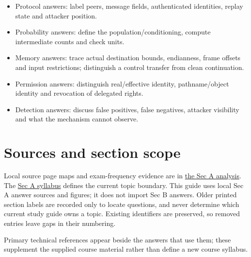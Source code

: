 \documentclass[11pt,a4paper]{article}
\begin{document}
\begin{itemize}

\item Protocol answers: label peers,\allowbreak{} message fields,\allowbreak{} authenticated identities,\allowbreak{} replay state and attacker position.

\item Probability answers: define the population/\allowbreak{}conditioning,\allowbreak{} compute intermediate counts and check units.

\item Memory answers: trace actual destination bounds,\allowbreak{} endianness,\allowbreak{} frame offsets and input restrictions; distinguish a control transfer from clean continuation.

\item Permission answers: distinguish real/\allowbreak{}effective identity,\allowbreak{} pathname/\allowbreak{}object identity and revocation of delegated rights.

\item Detection answers: discuss false positives,\allowbreak{} false negatives,\allowbreak{} attacker visibility and what the mechanism cannot observe.

\end{itemize}


\clearpage
\section{Sources and section scope}

Local source page maps and exam-frequency evidence are in \href{../analysis/FINAL_EXAM_TOPIC_ANALYSIS.md}{the Sec A analysis}. The \href{../analysis/SYLLABUS.md}{Sec A syllabus} defines the current topic boundary. This guide uses local Sec A answer sources and figures; it does not import Sec B answers. Older printed section labels are recorded only to locate questions,\allowbreak{} and never determine which current study guide owns a topic. Existing identifiers are preserved,\allowbreak{} so removed entries leave gaps in their numbering.


Primary technical references appear beside the answers that use them; these supplement the supplied course material rather than define a new course syllabus.
\end{document}
